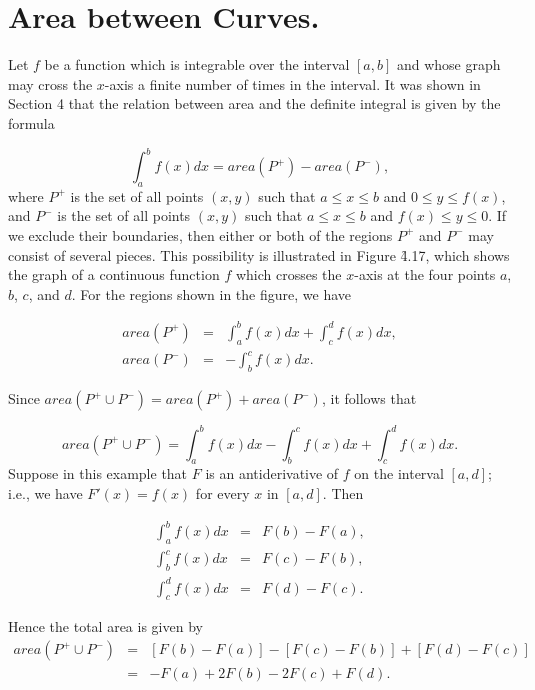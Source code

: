 \section{Area between Curves.}
 Let $f$ be a function which is integrable over the interval $[a, b]$ and
whose graph may cross the $x$-axis a finite number of times in the interval. It was shown in Section 4 that the relation between area and the definite integral is given by the formula

\begin{equation}
\int_{a}^{b} f(x) dx = area(P^{+}) - area(P^{-}),   
\label{eq4.7.1}
\end{equation}
\noindent where $P^{+}$ is the set of all points $(x,y)$ such that 
$a \leq x \leq b$ and $0 \leq y \leq f(x)$, and $P^{-}$ is the set of all points $(x, y)$ such that $a \leq x \leq b$
and $f(x) \leq y \leq 0$. If we exclude their boundaries, then either or both of the regions $P^{+}$ and $P^{-}$ may consist of several pieces. This possibility is illustrated in Figure \f{4.17}, which shows the graph of a continuous function $f$ 
which crosses the $x$-axis at the four points $a$, $b$, $c$, and $d$.  For the regions shown in the figure, we have


\begin{eqnarray*}
area(P^{+}) &=& \int_{a}^{b} f(x) dx + \int_{c}^{d} f(x) dx,\\
area(P^{-}) &=& - \int_{b}^{c} f(x) dx.
\end{eqnarray*}

\noindent Since $area(P^{+} \cup P^{-}) = area(P^{+}) + area(P^{-})$, it follows that

$$
area(P^{+} \cup P^{-}) = \int_{a}^{b} f(x) dx - \int_{b}^{c} f(x) dx + \int_{c}^{d} f(x) dx.
$$
\noindent Suppose in this example that $F$ is an antiderivative of $f$ on the interval $[a, d]$; i.e., we have $F'(x) = f(x)$ for every $x$ in $[a, d]$. Then

\begin{eqnarray*}
\int_{a}^{b} f(x) dx &=& F(b) - F(a),\\
\int_{b}^{c} f(x) dx &=& F(c) - F(b), \\
\int_{c}^{d} f(x) dx &=& F(d) - F(c).
\end{eqnarray*}

\noindent Hence the total area is given by
\begin{eqnarray*}
area(P^{+} \cup P^{-}) &=& [F(b) - F(a)] - [F(c) - F(b)] + [F(d) - F(c)] \\
                                    &=& -F(a) + 2F(b) - 2F(c) + F(d).
\end{eqnarray*}

